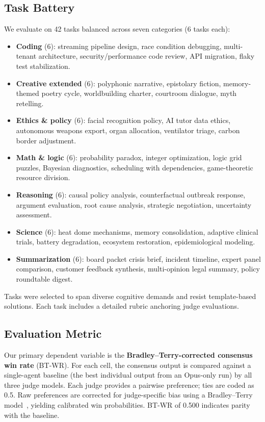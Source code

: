\documentclass[10pt,twocolumn]{article}
\theoremstyle{remark}
\begin{document}
\subsection{Task Battery}

We evaluate on 42 tasks balanced across seven categories (6 tasks each):

\begin{itemize}[nosep]
  \item \textbf{Coding} (6): streaming pipeline design, race condition debugging, multi-tenant architecture, security/performance code review, API migration, flaky test stabilization.
  \item \textbf{Creative extended} (6): polyphonic narrative, epistolary fiction, memory-themed poetry cycle, worldbuilding charter, courtroom dialogue, myth retelling.
  \item \textbf{Ethics \& policy} (6): facial recognition policy, AI tutor data ethics, autonomous weapons export, organ allocation, ventilator triage, carbon border adjustment.
  \item \textbf{Math \& logic} (6): probability paradox, integer optimization, logic grid puzzles, Bayesian diagnostics, scheduling with dependencies, game-theoretic resource division.
  \item \textbf{Reasoning} (6): causal policy analysis, counterfactual outbreak response, argument evaluation, root cause analysis, strategic negotiation, uncertainty assessment.
  \item \textbf{Science} (6): heat dome mechanisms, memory consolidation, adaptive clinical trials, battery degradation, ecosystem restoration, epidemiological modeling.
  \item \textbf{Summarization} (6): board packet crisis brief, incident timeline, expert panel comparison, customer feedback synthesis, multi-opinion legal summary, policy roundtable digest.
\end{itemize}

Tasks were selected to span diverse cognitive demands and resist template-based solutions. Each task includes a detailed rubric anchoring judge evaluations.

\subsection{Evaluation Metric}
\label{sec:metric}

Our primary dependent variable is the \textbf{Bradley--Terry-corrected consensus win rate} (BT-WR). For each cell, the consensus output is compared against a single-agent baseline (the best individual output from an Opus-only run) by all three judge models. Each judge provides a pairwise preference; ties are coded as 0.5. Raw preferences are corrected for judge-specific bias using a Bradley--Terry model~\cite{bradley1952rank}, yielding calibrated win probabilities. BT-WR of 0.500 indicates parity with the baseline.
\end{document}
